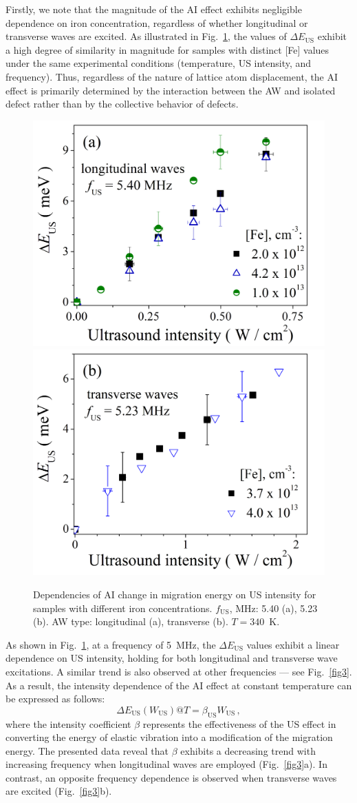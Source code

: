 \documentclass{ttp}
\begin{document}
Firstly, we note that the magnitude of the AI effect exhibits negligible dependence
on iron concentration, regardless of whether longitudinal or transverse waves are excited.
As illustrated in Fig.~\ref{fig2}, the values of $\Delta E_\mathrm{US}$ exhibit a high degree of similarity
in magnitude for samples with distinct [Fe] values under the same experimental conditions
(temperature, US intensity, and frequency).
Thus, regardless of the nature of lattice atom displacement,
the AI effect is primarily determined by the interaction between the AW and isolated defect
rather than by the collective behavior of defects.

\begin{figure}
	\centering
     \includegraphics[width=0.4\linewidth]{Fig2a.png}
     \includegraphics[width=0.4\linewidth]{Fig2b.png}
	  \caption{Dependencies of AI change in migration energy on US intensity for
       samples with different  iron concentrations.
       $f_\mathrm{US}$, MHz: 5.40 (a), 5.23 (b).
       AW type: longitudinal (a), transverse (b).
       $T=340$~K.
}\label{fig2}
\end{figure}

As shown in Fig.~\ref{fig2}, at a frequency of 5~MHz,
the $\Delta E_\mathrm{US}$ values exhibit a linear dependence on US intensity,
holding for both longitudinal and transverse wave excitations.
A similar trend is also observed at other frequencies --- see Fig.~\ref{fig3}.
As a result, the intensity dependence of the AI effect at constant temperature can be expressed as follows:
\begin{equation}\label{eq3O}
  \Delta E_\mathrm{US}(W_\mathrm{US})@ T = \beta_\mathrm{US} W_\mathrm{US}\,,
\end{equation}
where
the intensity coefficient $\beta$ represents the effectiveness of the US effect
in converting the energy of elastic vibration into a modification of the migration energy.
The presented data reveal that $\beta$ exhibits a decreasing trend
with increasing frequency when longitudinal waves are employed (Fig.~\ref{fig3}a).
In contrast, an opposite frequency dependence is observed when transverse waves are excited (Fig.~\ref{fig3}b).
\end{document}
